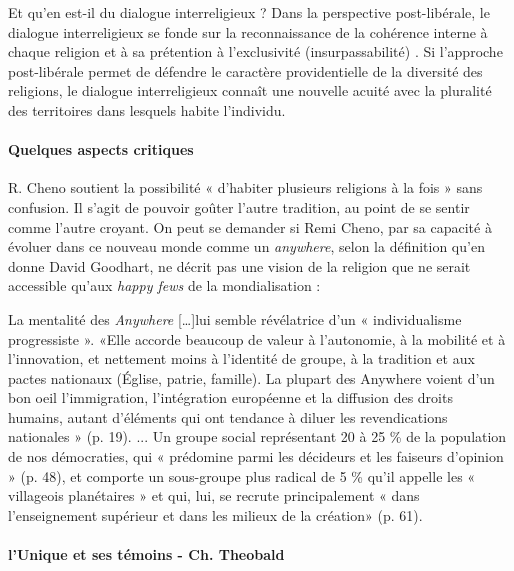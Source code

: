 Et qu’en est-il du dialogue interreligieux ? Dans la perspective post-libérale, le dialogue interreligieux se fonde sur la reconnaissance de la cohérence interne à chaque religion et à sa prétention à l’exclusivité (insurpassabilité) \cite[p. 129]{cheno_dieu_2017}. Si l'approche post-libérale permet de défendre le caractère providentielle de la diversité des religions, le dialogue interreligieux connaît une nouvelle acuité avec la pluralité des territoires dans lesquels habite l’individu.


\paragraph{Quelques aspects critiques}
 R. Cheno soutient la possibilité « d’habiter plusieurs religions à la fois » sans confusion\cite[p. 147]{cheno_dieu_2017}. Il s’agit de pouvoir goûter l’autre tradition, au point de se sentir comme l’autre croyant. On peut se demander si Remi Cheno, par sa capacité à évoluer dans ce nouveau monde comme un \textit{anywhere}, selon la définition qu'en donne David Goodhart, ne décrit pas une vision de la religion que ne serait accessible qu'aux \textit{happy fews} de la mondialisation : 
\begin{singlequote}
    La mentalité des \textit{Anywhere} [\ldots]lui semble révélatrice d'un « individualisme progressiste ». «Elle accorde beaucoup de valeur à l'autonomie, à la mobilité et à l'innovation, et nettement moins à l'identité de groupe, à la tradition et aux pactes nationaux (Église, patrie, famille). La plupart des Anywhere voient d'un bon oeil l'immigration, l'intégration européenne et la diffusion des droits humains, autant d'éléments qui ont tendance à diluer les revendications nationales » (p. 19). ... Un groupe social représentant 20 à 25 \% de la population de nos démocraties, qui «  prédomine parmi les décideurs et les faiseurs d'opinion » (p. 48), et comporte un sous-groupe plus radical de 5 \% qu'il appelle les « villageois planétaires » et qui, lui, se recrute principalement « dans l'enseignement supérieur et dans les milieux de la création» (p. 61). \cite{christophe_boutin_anywhere_2022}
\end{singlequote}

\newpage



 
 
 
\paragraph{l'Unique et ses témoins - Ch. Theobald} \cite{theobald_christianisme_2007}   

